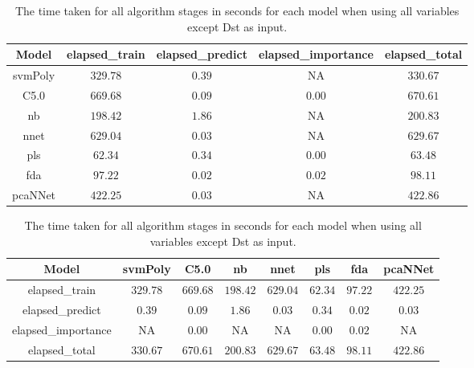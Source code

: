 \begin{table}[!ht]
	\centering
	\begin{tabular}{|c|c|c|c|c|}
		\hline
		Model & elapsed_train & elapsed_predict & elapsed_importance & elapsed_total \\ \hline
		svmPoly & $329.78$ & $0.39$ & NA & $330.67$ \\ \hline
		C5.0 & $669.68$ & $0.09$ & $0.00$ & $670.61$ \\ \hline
		nb & $198.42$ & $1.86$ & NA & $200.83$ \\ \hline
		nnet & $629.04$ & $0.03$ & NA & $629.67$ \\ \hline
		pls & $62.34$ & $0.34$ & $0.00$ & $63.48$ \\ \hline
		fda & $97.22$ & $0.02$ & $0.02$ & $98.11$ \\ \hline
		pcaNNet & $422.25$ & $0.03$ & NA & $422.86$ \\ \hline
	\end{tabular}
	\caption{The time taken for all algorithm stages in seconds for each model when using all variables except Dst as input.}
	\label{tab:time:noDst}
\end{table}

\begin{table}[!ht]
	\centering
	\begin{tabular}{|c|c|c|c|c|c|c|c|}
		\hline
		Model & svmPoly & C5.0 & nb & nnet & pls & fda & pcaNNet \\ \hline
		elapsed_train & $329.78$ & $669.68$ & $198.42$ & $629.04$ & $62.34$ & $97.22$ & $422.25$ \\ \hline
		elapsed_predict & $0.39$ & $0.09$ & $1.86$ & $0.03$ & $0.34$ & $0.02$ & $0.03$ \\ \hline
		elapsed_importance & NA & $0.00$ & NA & NA & $0.00$ & $0.02$ & NA \\ \hline
		elapsed_total & $330.67$ & $670.61$ & $200.83$ & $629.67$ & $63.48$ & $98.11$ & $422.86$ \\ \hline
	\end{tabular}
	\caption{The time taken for all algorithm stages in seconds for each model when using all variables except Dst as input.}
	\label{tab:time:reverse:noDst}
\end{table}

